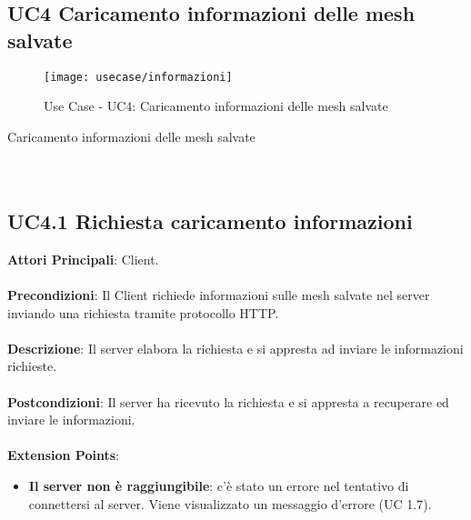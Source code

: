 
\subsection{UC4 Caricamento informazioni delle mesh salvate}
\begin{figure}[!h] 
    \centering 
    \texttt{[image: usecase/informazioni]} 
    \caption{Use Case - UC4: Caricamento informazioni delle mesh salvate}
\end{figure}

\begin{usecase}{4}{Caricamento informazioni delle mesh salvate}
\\ 
\\ 
\\ 
\label{uc:informazioni}
\end{usecase}

\subsection{UC4.1 Richiesta caricamento informazioni}
\textbf{Attori Principali}: Client.
\\\\ \textbf{Precondizioni}: Il Client richiede informazioni sulle mesh salvate nel server inviando una richiesta tramite protocollo HTTP.
\\\\ \textbf{Descrizione}: Il server elabora la richiesta e si appresta ad inviare le informazioni richieste.
\\\\ \textbf{Postcondizioni}: Il server ha ricevuto la richiesta e si appresta a recuperare ed inviare le informazioni.
\\\\ \textbf{Extension Points}:
\begin{itemize}
\item \textbf{Il server non è raggiungibile}: c'è stato un errore nel tentativo di connettersi al server. Viene visualizzato un messaggio d'errore (UC 1.7).
\end{itemize}

